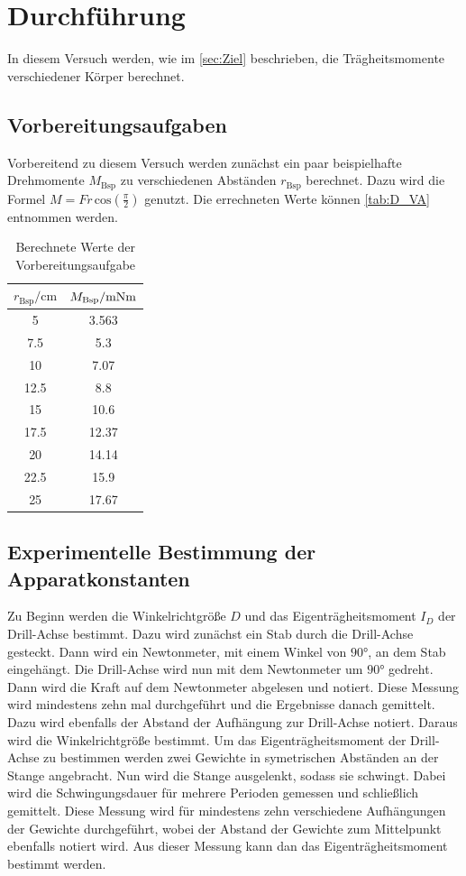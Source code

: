 \section{Durchführung}
\label{sec:Durchführung}
In diesem Versuch werden, wie im \autoref{sec:Ziel} beschrieben, die Trägheitsmomente verschiedener Körper berechnet. 

\subsection{Vorbereitungsaufgaben}
\label{subsec:D_Va}
Vorbereitend zu diesem Versuch werden zunächst ein paar beispielhafte Drehmomente $M_{\text{Bsp}}$
zu verschiedenen Abständen $r_{\text{Bsp}}$ berechnet. Dazu wird die Formel $M = Fr\, \text{cos}(\frac{\pi}{2})$ genutzt. Die errechneten Werte können \autoref{tab:D_VA} entnommen werden.
\begin{table}
    \centering
    \caption{Berechnete Werte der Vorbereitungsaufgabe} 
    \label{tab:D_VA}
    \begin{tabular}{c c}
        \toprule
        $r_{\text{Bsp}}\mathrm{/} \unit{\centi\metre}$ & $M_{\text{Bsp}}\mathrm{/}\unit{{\milli\newton\metre}}$\\
        \midrule
        5 & 3.563 \\
        7.5 & 5.3 \\
        10 & 7.07 \\
        12.5 & 8.8 \\
        15 & 10.6 \\
        17.5 & 12.37 \\
        20 & 14.14 \\
        22.5 & 15.9 \\
        25 & 17.67 \\
        \bottomrule 
    \end{tabular}
\end{table}
\subsection{Experimentelle Bestimmung der Apparatkonstanten}
\label{subsec:D_const}
Zu Beginn werden die Winkelrichtgröße $D$ und das Eigenträgheitsmoment $I_D$ der Drill-Achse bestimmt. Dazu wird zunächst ein Stab durch die Drill-Achse gesteckt. Dann wird ein Newtonmeter, mit einem 
Winkel von $90\unit{\degree}$, an dem Stab eingehängt. Die Drill-Achse wird nun mit dem Newtonmeter um $90\unit{\degree}$ gedreht. Dann wird die Kraft auf dem Newtonmeter abgelesen und notiert. Diese 
Messung wird mindestens zehn mal durchgeführt und die Ergebnisse danach gemittelt. Dazu wird ebenfalls der Abstand der Aufhängung zur Drill-Achse notiert. Daraus wird die Winkelrichtgröße 
bestimmt. Um das Eigenträgheitsmoment der Drill-Achse zu bestimmen werden zwei Gewichte in symetrischen Abständen an der Stange angebracht. Nun wird die Stange ausgelenkt, sodass sie schwingt.
Dabei wird die Schwingungsdauer für mehrere Perioden gemessen und schließlich gemittelt. Diese Messung wird für mindestens zehn verschiedene Aufhängungen der Gewichte durchgeführt, wobei der Abstand
der Gewichte zum Mittelpunkt ebenfalls notiert wird. Aus dieser Messung kann dan das Eigenträgheitsmoment bestimmt werden.
